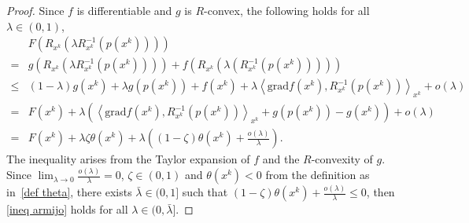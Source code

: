 \documentclass[10pt,a4paper]{amsart}
\newcommand{\grad}{\mathrm{grad}}
\begin{document}
\begin{proof}
    Since $f$ is differentiable and $g$ is $R$-convex, the following holds for all $\lambda \in(0,1)$, 
    $$
    \begin{aligned}
    & F (R_{x^k} (\lambda R_{x^k}^{-1} (p(x^k)))) \\
    = & g (R_{x^k} (\lambda R_{x^k}^{-1} (p(x^k)))) + f(R_{x^k} (\lambda (R_{x^k}^{-1} (p(x^k))))) \\
    \leq & (1-\lambda) g (x^k) + \lambda g (p(x^k)) + f(x^k) + \lambda \left\langle \grad f (x^k), R_{x^k}^{-1} (p(x^k)) \right\rangle_{x^k} + {o}(\lambda) \\
    = & F (x^k) + \lambda \left( \left\langle \grad f (x^k), R_{x^k}^{-1} (p(x^k)) \right\rangle_{x^k} + g (p(x^k)) - g (x^k) \right) + {o}(\lambda) \\
    = & F(x^k) + \lambda \zeta \theta(x^k) + \lambda \left( (1-\zeta) \theta(x^k) + \frac{{o}(\lambda)}{\lambda} \right).
    \end{aligned}
    $$
    The inequality arises from the Taylor expansion of \(f\) and the $R$-convexity of \(g\).
    Since $\lim _{\lambda \rightarrow 0} \frac{{o}(\lambda)}{\lambda}=0$, $\zeta \in(0,1)$ and $\theta(x^k) < 0$ from the definition as in~\eqref{def theta}, there exists $\bar{\lambda} \in(0,1]$ such that $(1-\zeta) \theta(x^k)+\frac{{o}(\lambda)}{\lambda} \leq 0$,
    then \eqref{ineq armijo} holds for all $\lambda \in(0, \bar{\lambda}]$.
\end{proof}
\end{document}
